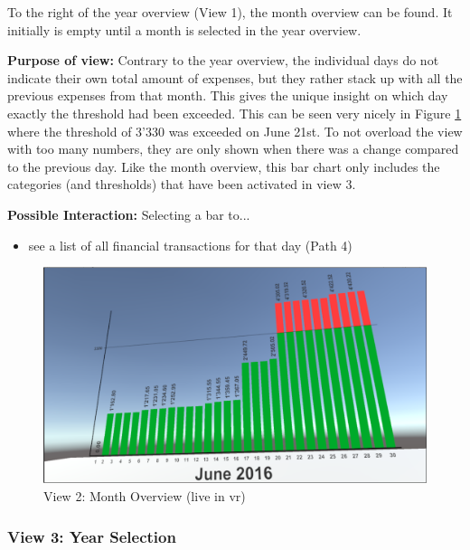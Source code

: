 To the right of the year overview (View 1), the month overview can be found. It initially is empty until a month is selected in the year overview.

\textbf{Purpose of view:} Contrary to the year overview, the individual days do not indicate their own total amount of expenses, but they rather stack up with all the previous expenses from that month. This gives the unique insight on which day exactly the threshold had been exceeded. This can be seen very nicely in Figure \ref{fig:unityview2} where the threshold of 3'330 was exceeded on June 21st. To not overload the view with too many numbers, they are only shown when there was a change compared to the previous day. Like the month overview, this bar chart only includes the categories (and thresholds) that have been activated in view 3.

\textbf{Possible Interaction:} Selecting a bar to...
\begin{itemize}[noitemsep,nolistsep]
	\item see a list of all financial transactions for that day (Path 4)
\end{itemize}

\begin{figure}[h]
	\begin{center}
		\includegraphics[width=14cm]{03_Figures/08_Development/View2_MonthOverview.png}
		\caption{View 2: Month Overview (live in \gls{vr})}
		\label{fig:unityview2}
	\end{center}
\end{figure}


\subsubsection{View 3: Year Selection}

